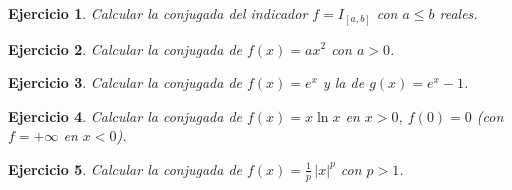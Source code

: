 \documentclass[11pt]{report}
\newtheorem{ex}{Ejercicio}
\newcommand{\indic}{I}
\begin{document}
\begin{ex}
Calcular la conjugada del indicador $f=\indic_{[a,b]}$ con
$a\le b$ reales.
\end{ex}

\begin{ex}
Calcular la conjugada de $f(x)=ax^2$ con $a>0$.
\end{ex}

\begin{ex}
Calcular la conjugada de $f(x)=e^{x}$ y la de
$g(x)=e^{x}-1$.
\end{ex}

\begin{ex}
Calcular la conjugada de $f(x)=x\ln x$ en $x>0$,
$f(0)=0$ (con $f=+\infty$ en $x<0$).
\end{ex}

\begin{ex}
Calcular la conjugada de $f(x)=\tfrac{1}{p}\,|x|^p$ con $p>1$.
\end{ex}
\end{document}
